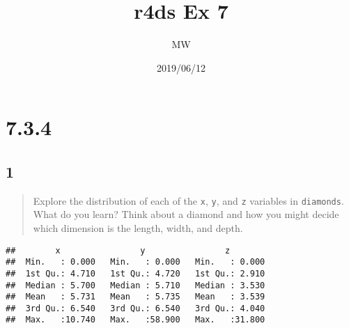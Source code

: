 \documentclass[]{article}
\title{r4ds Ex 7}
\author{MW}
\date{2019/06/12}
\newenvironment{Shaded}{\begin{snugshade}}{\end{snugshade}}
\newcommand{\DataTypeTok}[1]{\textcolor[rgb]{0.13,0.29,0.53}{#1}}
\newcommand{\KeywordTok}[1]{\textcolor[rgb]{0.13,0.29,0.53}{\textbf{#1}}}
\newcommand{\NormalTok}[1]{#1}
\newcommand{\OperatorTok}[1]{\textcolor[rgb]{0.81,0.36,0.00}{\textbf{#1}}}
\newcommand{\StringTok}[1]{\textcolor[rgb]{0.31,0.60,0.02}{#1}}
\begin{document}
\maketitle

\hypertarget{section}{%
\section{7.3.4}\label{section}}

\hypertarget{section-1}{%
\subsection{1}\label{section-1}}

\begin{quote}
Explore the distribution of each of the \texttt{x}, \texttt{y}, and
\texttt{z} variables in \texttt{diamonds}. What do you learn? Think
about a diamond and how you might decide which dimension is the length,
width, and depth.
\end{quote}

\begin{Shaded}
\end{Shaded}

\begin{verbatim}
##        x                y                z         
##  Min.   : 0.000   Min.   : 0.000   Min.   : 0.000  
##  1st Qu.: 4.710   1st Qu.: 4.720   1st Qu.: 2.910  
##  Median : 5.700   Median : 5.710   Median : 3.530  
##  Mean   : 5.731   Mean   : 5.735   Mean   : 3.539  
##  3rd Qu.: 6.540   3rd Qu.: 6.540   3rd Qu.: 4.040  
##  Max.   :10.740   Max.   :58.900   Max.   :31.800
\end{verbatim}

\begin{Shaded}
\end{Shaded}
\end{document}
